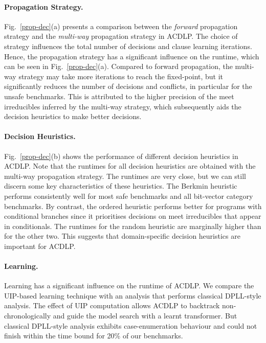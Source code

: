 \paragraph{Propagation Strategy.}
%
Fig.~\ref{prop-dec}(a) presents a comparison between the {\em forward}
propagation strategy and the {\em multi-way} propagation strategy in ACDLP.  The
choice of strategy influences the total number of decisions
and clause learning iterations.  Hence, the propagation strategy has a
significant influence on the runtime, which can be seen in
Fig.~\ref{prop-dec}(a).  Compared to forward propagation, the multi-way
strategy may take more iterations to reach the fixed-point, but it
significantly reduces the number of decisions and conflicts, in
particular for the unsafe benchmarks.  This is attributed to the higher
precision of the meet irreducibles inferred by the multi-way strategy, which
subsequently aids the decision heuristics to make better decisions.

\paragraph{Decision Heuristics.}
%
Fig.~\ref{prop-dec}(b) shows the performance of different decision
heuristics in ACDLP.  Note that the runtimes for all decision heuristics are
obtained with the multi-way propagation strategy.  The runtimes are very
close, but we can still discern some key characteristics of these
heuristics.  The Berkmin heuristic performs consistently well for most safe
benchmarks and all bit-vector category benchmarks.  By contrast, the ordered
heuristic performs better for programs with conditional branches since it
prioritises decisions on meet irreducibles that appear in conditionals.  The
runtimes for the random heuristic are marginally higher than for the other
two.  This suggests that domain-specific decision heuristics are important
for ACDLP.
%


\paragraph{Learning.}
%
Learning has a significant influence on the runtime of ACDLP.  We compare
the UIP-based learning technique with an analysis that performs classical 
DPLL-style analysis.
The effect of UIP computation allows ACDLP to backtrack non-chronologically 
and guide the model search with a learnt transformer.  But classical 
DPLL-style analysis exhibits case-enumeration behaviour and could not finish 
within the time bound for 20\% of our benchmarks.
%
